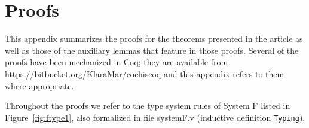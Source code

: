 \newcommand{\dnode}[4]
{\node[punkt, #2] (#1) {Lemma~\ref{#3} \nodepart{second}\it #4};}

{}

\section{Proofs}

This appendix summarizes the proofs for the theorems presented in the article
as well as those of the auxiliary lemmas that feature in those proofs.
Several of the proofs have been mechanized in Coq; they are available from
\url{https://bitbucket.org/KlaraMar/cochiscoq} and this appendix refers to 
them where appropriate.

Throughout the proofs we refer to the type system rules of System F listed
in Figure~\ref{fig:ftype1}, also formalized in file systemF.v (inductive
definition \texttt{Typing}).

